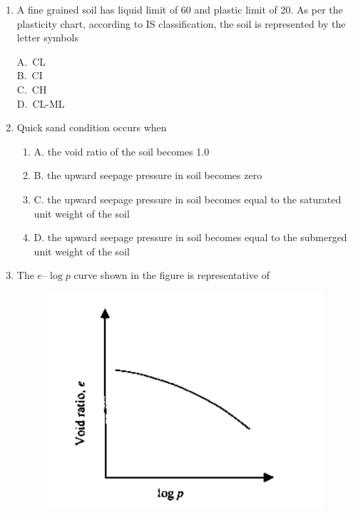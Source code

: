 \documentclass[journal,12pt,onecolumn]{exam}
\theoremstyle{remark}
\begin{document}
\begin{enumerate}
\noindent\item A fine grained soil has liquid limit of 60 and plastic limit of 20. As per the plasticity chart, according to IS classification, the soil is represented by the letter symbols 
\hfill{}
\begin{multicols}{4}
A.\ CL \\
B.\ CI \\
C.\ CH \\
D.\ CL-ML
\end{multicols}

\noindent\item Quick sand condition occurs when 
\hfill{}


\begin{enumerate}[label=]
 \item A. the void ratio of the soil becomes 1.0 
 \item B. the upward seepage pressure in soil becomes zero 
 \item C. the upward seepage pressure in soil becomes equal to the saturated unit weight of the soil 
 \item D. the upward seepage pressure in soil becomes equal to the submerged unit weight of the soil
 \end{enumerate}


\noindent\item The $e$--$\log p$ curve shown in the figure is representative of 
\hfill{}

\begin{figure}[H]
     \centering
     \includegraphics[scale=0.5]{figs/3e0ddfff-16d6-49d4-a917-0f59027d78f5.jpg} 
     \caption{}
     \label{fig:figure2}
 \end{figure}
    

\end{enumerate}
\end{document}
